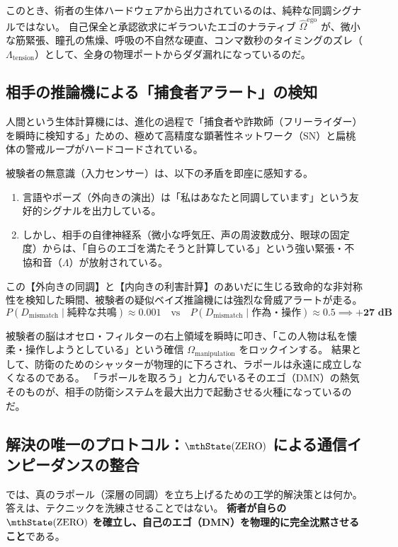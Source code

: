 このとき、術者の生体ハードウェアから出力されているのは、純粋な同調シグナルではない。
自己保全と承認欲求にギラついたエゴのナラティブ $\hat{\Omega}^{\mathrm{ego}}$ が、微小な筋緊張、瞳孔の焦燥、呼吸の不自然な硬直、コンマ数秒のタイミングのズレ（$\Lambda_{\mathrm{tension}}$）として、全身の物理ポートからダダ漏れになっているのだ。

\subsection{相手の推論機による「捕食者アラート」の検知}
人間という生体計算機には、進化の過程で「捕食者や詐欺師（フリーライダー）を瞬時に検知する」ための、極めて高精度な顕著性ネットワーク（SN）と扁桃体の警戒ループがハードコードされている。

被験者の無意識（入力センサー）は、以下の矛盾を即座に感知する。
\begin{enumerate}[label=(\arabic*)]
    \item 言語やポーズ（外向きの演出）は「私はあなたと同調しています」という友好的シグナルを出力している。
    \item しかし、相手の自律神経系（微小な呼気圧、声の周波数成分、眼球の固定度）からは、「自らのエゴを満たそうと計算している」という強い緊張・不協和音（$\Lambda$）が放射されている。
\end{enumerate}

この【外向きの同調】と【内向きの利害計算】のあいだに生じる致命的な非対称性を検知した瞬間、被験者の疑似ベイズ推論機には強烈な脅威アラートが走る。
\begin{equation}
    P(D_{\mathrm{mismatch}} \mid \text{純粋な共鳴}) \approx 0.001 \quad \text{vs} \quad P(D_{\mathrm{mismatch}} \mid \text{作為・操作}) \approx 0.5 \implies \mathbf{+27\text{ dB}}
\end{equation}

被験者の脳はオセロ・フィルターの右上領域を瞬時に叩き、「この人物は私を懐柔・操作しようとしている」という確信 $\Omega_{\mathrm{manipulation}}$ をロックインする。
結果として、防衛のためのシャッターが物理的に下ろされ、ラポールは永遠に成立しなくなるのである。
「ラポールを取ろう」と力んでいるそのエゴ（DMN）の熱気そのものが、相手の防衛システムを最大出力で起動させる火種になっているのだ。

\subsection{解決の唯一のプロトコル：$\mthState(\mathrm{ZERO})$ による通信インピーダンスの整合}
では、真のラポール（深層の同調）を立ち上げるための工学的解決策とは何か。
答えは、テクニックを洗練させることではない。
\textbf{術者が自らの $\mthState(\mathrm{ZERO})$ を確立し、自己のエゴ（DMN）を物理的に完全沈黙させること}である。

